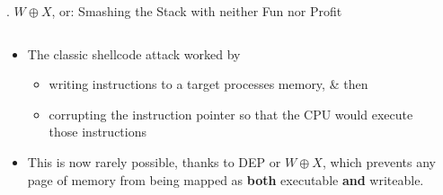 \documentclass[9pt]{beamer}
\begin{document}
\begin{frame}{\theframenumber. $W\oplus X$, or: Smashing the Stack with neither Fun nor Profit}
  \begin{columns}
    \begin{column}{.5\textwidth}
      \begin{itemize}
      \item The classic shellcode attack worked by
        \begin{itemize}
        \item writing instructions to a target processes memory, \& then
        \item corrupting the instruction pointer so that the CPU would execute those instructions
        \end{itemize}
      \item This is now rarely possible, thanks to DEP or $W\oplus X$, which prevents any page of memory from being mapped as \textbf{both} executable \textbf{and} writeable.
      \end{itemize}
    \end{column}
    \begin{column}{.5\textwidth}

\end{column}
\end{columns}
\end{frame}
\end{document}

